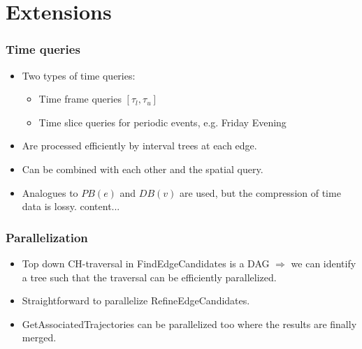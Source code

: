 \documentclass{beamer}
\newcommand{\findEdgeCandidates}{FindEdgeCandidates\xspace}
\newcommand{\refineEdgeCandidates}{RefineEdgeCandidates\xspace}
\newcommand{\getAssociatedTrajectories}{GetAssociatedTrajectories\xspace}
\begin{document}
%

\section{Extensions}

\begin{frame}
	\frametitle{Time queries}
	\begin{itemize}

		\item	Two types of time queries: \pause
		      \begin{itemize}
			      \item Time frame queries $[\tau_l, \tau_u]$ \pause
			      \item Time slice queries for periodic events, e.g. Friday Evening \pause
		      \end{itemize}
		\item	Are processed efficiently by interval trees at each edge. \pause

		\item Can be combined with each other and the spatial query. \pause

		\item	Analogues to $PB(e)$ and $DB(v)$ are used, but the compression of time data is lossy.
		      content...
	\end{itemize}
\end{frame}

\begin{frame}
	\frametitle{Parallelization}
	\begin{itemize}
		\item<1-> Top down CH-traversal in \findEdgeCandidates is a DAG \pause $\Rightarrow$ we can identify a tree such that the traversal can be efficiently parallelized.
		\item<2-> Straightforward to parallelize \refineEdgeCandidates.
		\item<3-> \getAssociatedTrajectories can be parallelized too where the results are finally merged.
	\end{itemize}
\end{frame}
\end{document}
